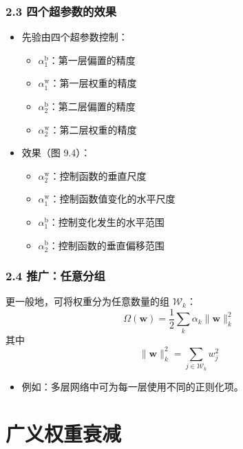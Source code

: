 \documentclass[t,aspectratio=169]{beamer} %
\begin{document}
\begin{frame}
    \frametitle{2.3 四个超参数的效果}
    \begin{itemize}
        \item 先验由四个超参数控制：
        \begin{itemize}
            \item $\alpha_1^\mathrm{b}$：第一层偏置的精度
            \item $\alpha_1^\mathrm{w}$：第一层权重的精度
            \item $\alpha_2^\mathrm{b}$：第二层偏置的精度
            \item $\alpha_2^\mathrm{w}$：第二层权重的精度
        \end{itemize}
        \item 效果（图 9.4）：
        \begin{itemize}
            \item $\alpha_2^\mathrm{w}$：控制函数的\alert{垂直尺度}
            \item $\alpha_1^\mathrm{w}$：控制函数值变化的\alert{水平尺度}
            \item $\alpha_1^\mathrm{b}$：控制变化发生的\alert{水平范围}
            \item $\alpha_2^\mathrm{b}$：控制函数的\alert{垂直偏移范围}
        \end{itemize}
    \end{itemize}
\end{frame}

\begin{frame}
    \frametitle{2.4 推广：任意分组}
    更一般地，可将权重分为任意数量的组 $\mathcal{W}_k$：
    \begin{equation}
        \Omega(\mathbf{w}) = \frac{1}{2} \sum_k \alpha_k \|\mathbf{w}\|_k^2
        \tag{9.16}
    \end{equation}
    其中
    \begin{equation}
        \|\mathbf{w}\|_k^2 = \sum_{j \in \mathcal{W}_k} w_j^2
        \tag{9.17}
    \end{equation}
    \begin{itemize}
        \item 例如：多层网络中可为\alert{每一层使用不同的正则化项}。
    \end{itemize}
\end{frame}

\section{广义权重衰减}
\end{document}
